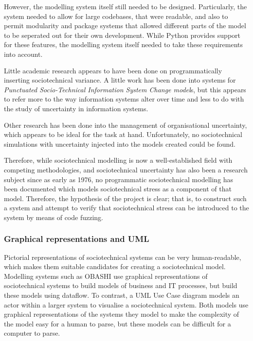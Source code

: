 \documentclass{sig-alternate}
\begin{document}
However, the modelling system itself still needed to be designed. Particularly, the system needed to allow for large codebases, that were readable, and also to permit modularity and package systems that allowed different parts of the model to be seperated out for their own development. While Python provides support for these features, the modelling system itself needed to take these requirements into account.  \par

Little academic research appears to have been done on programmatically inserting sociotechnical variance. A little work has been done into systems for \emph{Punctuated Socio-Technical Information System Change model}s\cite{Lyytinen2008}, but this appears to refer more to the way information systems alter over time and less to do with the study of uncertainty in information systems. \par


Other research has been done into the management of organisational uncertainty\cite{grote2004uncertainty}\cite{Herrmann1999}, which appears to be ideal for the task at hand. Unfortunately, no sociotechnical simulations with uncertainty injected into the models created could be found. \par
Therefore, while sociotechnical modelling is now a well-established field with competing methodologies, and sociotechnical uncertainty has also been a research subject since as early as 1976\cite{Susman1976}, no programmatic sociotechnical modelling has been documented which models sociotechnical stress as a component of that model. Therefore, the hypothesis of the project is clear; that is, to construct such a system and attempt to verify that sociotechnical stress can be introduced to the system by means of code fuzzing. \par


\subsubsection{Graphical representations and UML}
\label{pictorial}
Pictorial representations of sociotechnical systems can be very human-readable, which makes them suitable candidates for creating a sociotechnical model. Modelling systems such as OBASHI\cite{ObashiMethodology} use graphical representations of sociotechnical systems to build models of business and IT processes, but build these models using dataflow. To contrast, a UML Use Case diagram\cite{omg2010omguml} models an actor within a larger system to visualise a sociotechnical system. Both models use graphical representations of the systems they model to make the complexity of the model easy for a human to parse, but these models can be difficult for a computer to parse. \par
\end{document}
